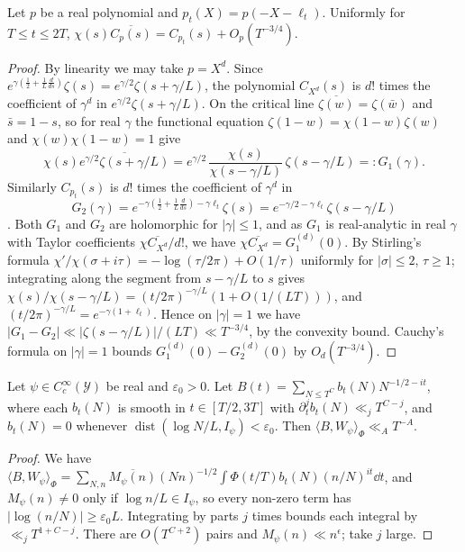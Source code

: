 \documentclass[11pt,colorlinks]{charlie}
\newcommand{\ip}[2]{\langle #1,#2\rangle}
\begin{document}
\begin{lemma}\label{lem:centredfe}
Let $p$ be a real polynomial and $p_t(X)=p(-X-\ell_t)$. Uniformly for $T\le t\le2T$, $\chi(s)\overline{C_p(s)}=C_{p_t}(s)+O_p(T^{-3/4})$.
\end{lemma}
\begin{proof}
By linearity we may take $p=X^d$. Since $e^{\gamma(\frac12+\frac1L\frac d{ds})}\zeta(s)=e^{\gamma/2}\zeta(s+\gamma/L)$, the polynomial $C_{X^d}(s)$ is $d!$ times the coefficient of $\gamma^d$ in $e^{\gamma/2}\zeta(s+\gamma/L)$. On the critical line $\overline{\zeta(w)}=\zeta(\bar w)$ and $\bar s=1-s$, so for real $\gamma$ the functional equation $\zeta(1-w)=\chi(1-w)\zeta(w)$ and $\chi(w)\chi(1-w)=1$ give
\[
 \chi(s)\overline{e^{\gamma/2}\zeta(s+\gamma/L)}=e^{\gamma/2}\,\frac{\chi(s)}{\chi(s-\gamma/L)}\,\zeta(s-\gamma/L)=:G_1(\gamma).
\]
Similarly $C_{p_t}(s)$ is $d!$ times the coefficient of $\gamma^d$ in
\[
 G_2(\gamma)=e^{-\gamma(\frac12+\frac1L\frac d{ds})-\gamma\ell_t}\zeta(s)=e^{-\gamma/2-\gamma\ell_t}\zeta(s-\gamma/L)
\]. Both $G_1$ and $G_2$ are holomorphic for $|\gamma|\le1$, and as $G_1$ is real-analytic in real $\gamma$ with Taylor coefficients $\chi\overline{C_{X^d}}/d!$, we have $\chi\overline{C_{X^d}}=G_1^{(d)}(0)$. By Stirling's formula $\chi'/\chi(\sigma+i\tau)=-\log(\tau/2\pi)+O(1/\tau)$ uniformly for $|\sigma|\le2$, $\tau\ge1$; integrating along the segment from $s-\gamma/L$ to $s$ gives $\chi(s)/\chi(s-\gamma/L)=(t/2\pi)^{-\gamma/L}(1+O(1/(LT)))$, and $(t/2\pi)^{-\gamma/L}=e^{-\gamma(1+\ell_t)}$. Hence on $|\gamma|=1$ we have $|G_1-G_2|\ll|\zeta(s-\gamma/L)|/(LT)\ll T^{-3/4}$, by the convexity bound. Cauchy's formula on $|\gamma|=1$ bounds $G_1^{(d)}(0)-G_2^{(d)}(0)$ by $O_d(T^{-3/4})$.
\end{proof}

\begin{lemma}\label{lem:localise}
Let $\psi\in C_c^\infty(\mathcal Y)$ be real and $\varepsilon_0>0$. Let $B(t)=\sum_{N\le T^C}b_t(N)N^{-1/2-it}$, where each $b_t(N)$ is smooth in $t\in[T/2,3T]$ with $\partial_t^jb_t(N)\ll_jT^{C-j}$, and $b_t(N)=0$ whenever $\operatorname{dist}(\log N/L,I_\psi)<\varepsilon_0$. Then $\ip B{W_\psi}_\Phi\ll_AT^{-A}$.
\end{lemma}
\begin{proof}
We have $\ip B{W_\psi}_\Phi=\sum_{N,n}\overline{M_\psi(n)}(Nn)^{-1/2}\int\Phi(t/T)b_t(N)(n/N)^{it}\dd t$, and $M_\psi(n)\ne0$ only if $\log n/L\in I_\psi$, so every non-zero term has $|\log(n/N)|\ge\varepsilon_0L$. Integrating by parts $j$ times bounds each integral by $\ll_jT^{1+C-j}$. There are $O(T^{C+2})$ pairs and $M_\psi(n)\ll n^\epsilon$; take $j$ large.
\end{proof}
\end{document}
